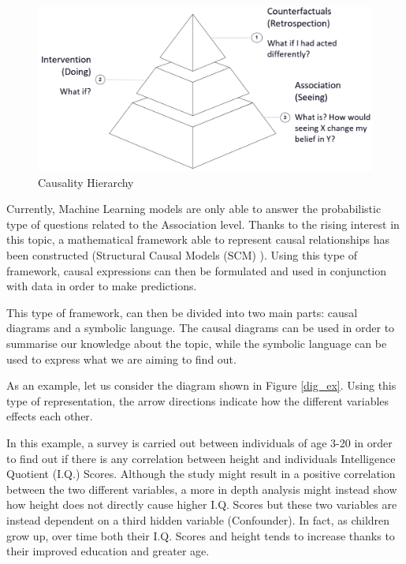 \begin{figure}[ht!]%
    \centering
    \includegraphics[width=0.8\linewidth]{latex/images/pyramid.pdf}
    \vspace{-0.2cm}
    \caption{Causality Hierarchy}
    \label{pyr}
\end{figure}
\vspace{-0.5cm}

Currently, Machine Learning models are only able to answer the probabilistic type of questions related to the Association level.
Thanks to the rising interest in this topic, a mathematical framework able to represent causal relationships has been constructed (Structural Causal Models (SCM) \cite{tools}). Using this type of framework, causal expressions can then be formulated and used in conjunction with data in order to make predictions.

This type of framework, can then be divided into two main parts: causal diagrams and a symbolic language. The causal diagrams can be used in order to summarise our knowledge about the topic, while the symbolic language can be used to express what we are aiming to find out.

As an example, let us consider the diagram shown in Figure \ref{dig_ex}. Using this type of representation, the arrow directions indicate how the different variables effects each other.

In this example, a survey is carried out between individuals of age 3-20 in order to find out if there is any correlation between height and individuals Intelligence Quotient (I.Q.) Scores. Although the study might result in a positive correlation between the two different variables, a more in depth analysis might instead show how height does not directly cause higher I.Q. Scores but these two variables are instead dependent on a third hidden variable (Confounder). In fact, as children grow up, over time both their I.Q. Scores and height tends to increase thanks to their improved education and greater age.  

